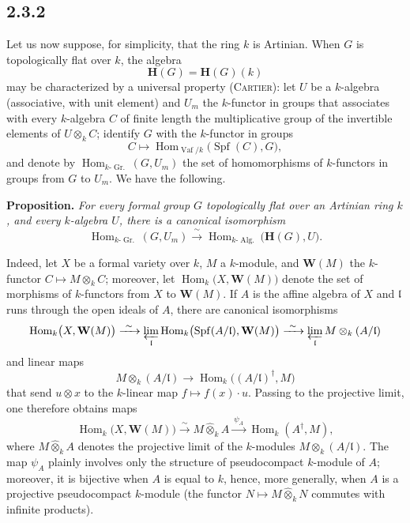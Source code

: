
\subsection*{2.3.2}
\label{sga3:VIIB:2.3.2}

Let us now suppose, for simplicity, that the ring \(k\) is Artinian.
When \(G\) is topologically flat over \(k\), the algebra
\[
  \mathbf H(G)=\mathbf H(G)(k)
\]
may be characterized by a universal property \textup{(\textsc{Cartier})}:
let \(U\) be a \(k\)-algebra \textup{(associative, with unit element)}
and \(U_m\) the \(k\)-functor in groups that associates with every
\(k\)-algebra \(C\) of finite length the multiplicative group of the
invertible elements of \(U\otimes_kC\); identify \(G\) with the
\(k\)-functor in groups
\[
  C\longmapsto
  \operatorname{Hom}_{\operatorname{Vaf}/k}
    \bigl(\operatorname{Spf}(C),G\bigr),
\]
and denote by
\(\operatorname{Hom}_{k\text{-}\operatorname{Gr.}}(G,U_m)\) the set of
homomorphisms of \(k\)-functors in groups from \(G\) to \(U_m\). We have
the following.

\medskip
\noindent\textbf{Proposition.}
\label{sga3:VIIB:2.3.2:prop}
{\itshape For every formal group \(G\) topologically flat over an
Artinian ring \(k\), and every \(k\)-algebra \(U\), there is a
canonical isomorphism
\[
  \operatorname{Hom}_{k\text{-}\operatorname{Gr.}}(G,U_m)
  \xrightarrow{\ \sim\ }
  \operatorname{Hom}_{k\text{-}\operatorname{Alg.}}
    \bigl(\mathbf H(G),U\bigr).
\]}

Indeed, let \(X\) be a formal variety over \(k\), \(M\) a
\(k\)-module, and \(\mathbf W(M)\) the \(k\)-functor
\(C\mapsto M\otimes_kC\); moreover, let
\(\operatorname{Hom}_k\bigl(X,\mathbf W(M)\bigr)\) denote the set of
morphisms of \(k\)-functors from \(X\) to \(\mathbf W(M)\). If \(A\) is
the affine algebra of \(X\) and \(\mathfrak l\) runs through the open
ideals of \(A\), there are canonical isomorphisms
\[
  \operatorname{Hom}_k\bigl(X,\mathbf W(M)\bigr)
  \xrightarrow{\ \sim\ }
  \varprojlim_{\mathfrak l}
  \operatorname{Hom}_k\bigl(\operatorname{Spf}(A/\mathfrak l),\mathbf W(M)\bigr)
  \xrightarrow{\ \sim\ }
  \varprojlim_{\mathfrak l}M\otimes_k(A/\mathfrak l)
\]
and linear maps
\[
  M\otimes_k(A/\mathfrak l)
  \longrightarrow
  \operatorname{Hom}_k\bigl((A/\mathfrak l)^\dagger,M\bigr)
\]
that send \(u\otimes x\) to the \(k\)-linear map
\(f\mapsto f(x)\cdot u\). Passing to the projective limit, one
therefore obtains maps
\[
  \operatorname{Hom}_k\bigl(X,\mathbf W(M)\bigr)
  \xrightarrow{\ \sim\ }
  M\widehat\otimes_kA
  \xrightarrow{\ \psi_A\ }
  \operatorname{Hom}_k(A^\dagger,M),
\]
where \(M\widehat\otimes_kA\) denotes the projective limit of the
\(k\)-modules \(M\otimes_k(A/\mathfrak l)\). The map \(\psi_A\) plainly
involves only the structure of pseudocompact \(k\)-module of \(A\);
moreover, it is bijective when \(A\) is equal to \(k\), hence, more
generally, when \(A\) is a projective pseudocompact \(k\)-module
\textup{(the functor \(N\mapsto M\widehat\otimes_kN\) commutes with
infinite products)}.

